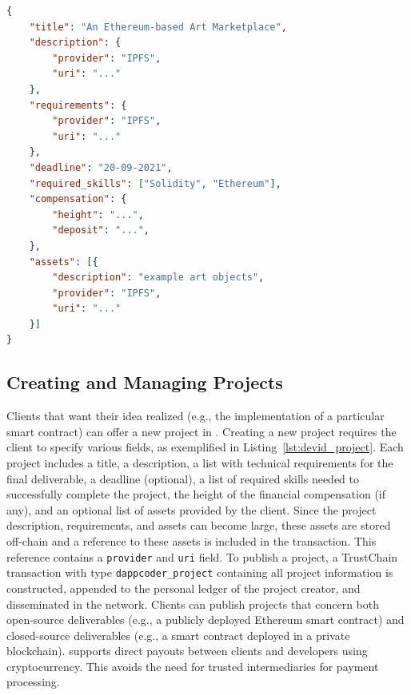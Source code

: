 \begin{lstlisting}[language=json,firstnumber=1,float=t,caption=A project offered in \Dappcoder{} (in JSON format).,label=lst:devid_project]
{
	"title": "An Ethereum-based Art Marketplace",
	"description": {
		"provider": "IPFS",
		"uri": "..."
	},
	"requirements": {
		"provider": "IPFS",
		"uri": "..."
	},
	"deadline": "20-09-2021",
	"required_skills": ["Solidity", "Ethereum"],
	"compensation": {
		"height": "...",
		"deposit": "...",
	},
	"assets": [{
		"description": "example art objects",
		"provider": "IPFS",
		"uri": "..."
	}]
}
\end{lstlisting}

\subsection{Creating and Managing Projects}
Clients that want their idea realized (e.g., the implementation of a particular smart contract) can offer a new project in \Dappcoder{}.
Creating a new project requires the client to specify various fields, as exemplified in Listing~\ref{lst:devid_project}.
Each project includes a title, a description, a list with technical requirements for the final deliverable, a deadline (optional), a list of required skills needed to successfully complete the project, the height of the financial compensation (if any), and an optional list of assets provided by the client.
Since the project description, requirements, and assets can become large, these assets are stored off-chain and a reference to these assets is included in the transaction.
This reference contains a \texttt{provider} and \texttt{uri} field.
To publish a project, a TrustChain transaction with type \texttt{dappcoder\_project} containing all project information is constructed, appended to the personal ledger of the project creator, and disseminated in the network.
Clients can publish projects that concern both open-source deliverables (e.g., a publicly deployed Ethereum smart contract) and closed-source deliverables (e.g., a smart contract deployed in a private blockchain).
\Dappcoder{} supports direct payouts between clients and developers using cryptocurrency.
This avoids the need for trusted intermediaries for payment processing.

